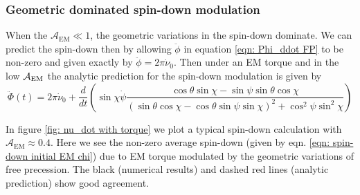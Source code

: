 \documentclass[/home/greg/Thesis/main/main.tex]{subfiles}
\begin{document}
\subsubsection{Geometric dominated spin-down modulation}
When the $\mathcal{A}_{\mathrm{EM}} \ll 1$, the geometric variations
in the spin-down dominate. We can predict the spin-down then by allowing 
$\ddot{\phi}$ in equation \eqref{eqn: Phi_ddot FP} to be non-zero and given
exactly by $\ddot{\phi} = 2\pi \dot{\nu}_{0}$. Then under an EM torque and 
in the low $\mathcal{A}_{\mathrm{EM}}$ the analytic prediction for the spin-down modulation is
given by 
\begin{equation}
    \ddot{\Phi}(t) = 2\pi \dot{\nu}_{0} + \frac{d}{dt}\left(
        \sin\chi\dot{\psi} \frac{\cos\theta\sin\chi - \sin \psi \sin \theta \cos\chi 
}{(\sin\theta \cos \chi - \cos \theta \sin \psi \sin \chi)^{2} + \cos^{2}\psi \sin^{2} \chi}
\right)
\label{eqn: 1238}
\end{equation}

In figure \ref{fig: nu_dot with torque} we plot a typical spin-down calculation
with $\mathcal{A}_{\mathrm{EM}} \approx 0.4$. Here we see  
the non-zero average spin-down (given by eqn. \eqref{eqn: spin-down initial EM chi})
due to EM torque modulated by the geometric variations of free precession. The
black (numerical results) and dashed red lines (analytic prediction) show good agreement.
\begin{figure}[htb]
\begin{floatrow}
\capbtabbox{%
  
}{%
  \caption{}%
  \label{tab: nu_dot with torque}
}
\end{floatrow}
\end{figure}

\FloatBarrier
\end{document}
